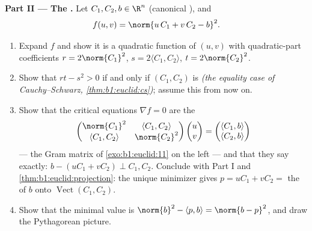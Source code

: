 \begin{problem}
\medskip
\noindent\textbf{Part II --- The .} Let $C_1,
C_2, b \in \R^n$ (canonical ), and
\[
f(u, v) = \norm{u\,C_1 + v\,C_2 - b}^2 .
\]
\begin{enumerate}[resume]
  \item Expand $f$ and show it is a quadratic function of $(u,
        v)$ with quadratic-part coefficients $r = 2\norm{C_1}^2$,
        $s = 2\langle C_1, C_2\rangle$, $t = 2\norm{C_2}^2$.
  \item Show that $rt - s^2 > 0$ if and only if $(C_1, C_2)$ is
         \emph{(the equality case of Cauchy--Schwarz,
        \cref{thm:b1:euclid:cs})}; assume this from now on.
  \item Show that the critical equations $\nabla f = 0$ are the
        \emph{}
        \[
        \begin{pmatrix}
        \norm{C_1}^2 & \langle C_1, C_2\rangle\\
        \langle C_1, C_2\rangle & \norm{C_2}^2
        \end{pmatrix}
        \begin{pmatrix} u\\ v\end{pmatrix}
        =
        \begin{pmatrix} \langle C_1, b\rangle\\ \langle C_2,
        b\rangle\end{pmatrix}
        \]
        --- the Gram matrix of \cref{exo:b1:euclid:11} on the
        left --- and that they say exactly: $b - (uC_1 + vC_2)
        \perp C_1, C_2$. Conclude with Part I and
        \cref{thm:b1:euclid:projection}: the unique minimizer
        gives $p = uC_1 + vC_2 = $ the  of
        $b$ onto $\operatorname{Vect}(C_1, C_2)$.
  \item Show that the minimal value is $\norm{b}^2 - \langle p,
        b\rangle = \norm{b - p}^2$, and draw the Pythagorean
        picture.
\end{enumerate}


\end{problem}
